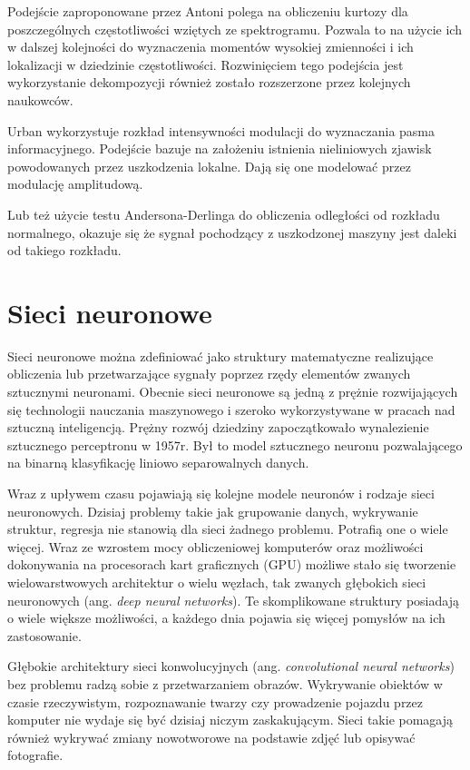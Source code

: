 \documentclass[inzynierska]{pwr_wmat_praca_dyplomowa}
\theoremstyle{plain}
\numberwithin{theorem}{chapter}
\theoremstyle{definition}
\numberwithin{theorem}{chapter}
\begin{document}
Podejście zaproponowane przez Antoni\cite{antoni} polega na obliczeniu kurtozy dla poszczególnych częstotliwości wziętych ze spektrogramu. Pozwala to na użycie ich w dalszej kolejności do wyznaczenia momentów wysokiej zmienności i ich lokalizacji w dziedzinie częstotliwości. Rozwinięciem tego podejścia jest wykorzystanie dekompozycji  również zostało rozszerzone przez kolejnych naukowców.\cite{antoni2}

Urban\cite{urban} wykorzystuje rozkład intensywności modulacji do wyznaczania pasma informacyjnego. Podejście bazuje na założeniu istnienia nieliniowych zjawisk powodowanych przez uszkodzenia lokalne. Dają się one modelować przez modulację amplitudową. 

Lub też użycie testu Andersona-Derlinga do obliczenia odległości od rozkładu normalnego, okazuje się że sygnał pochodzący z uszkodzonej maszyny jest daleki od takiego rozkładu\cite{wylomanska}.


\section{Sieci neuronowe}
Sieci neuronowe można zdefiniować jako struktury matematyczne realizujące obliczenia lub przetwarzające sygnały poprzez rzędy elementów zwanych sztucznymi neuronami.
Obecnie sieci neuronowe są jedną z prężnie rozwijających się technologii nauczania maszynowego i szeroko wykorzystywane w pracach nad sztuczną inteligencją.
Prężny rozwój dziedziny zapoczątkowało wynalezienie sztucznego perceptronu w 1957r. Był to model sztucznego neuronu pozwalającego na binarną klasyfikację liniowo separowalnych danych.

Wraz z upływem czasu pojawiają się kolejne modele neuronów i rodzaje sieci neuronowych. Dzisiaj problemy takie jak grupowanie danych, wykrywanie struktur, regresja nie stanowią dla sieci żadnego problemu. Potrafią one o wiele więcej. Wraz ze wzrostem mocy obliczeniowej komputerów oraz możliwości dokonywania na procesorach kart graficznych (GPU) możliwe stało się tworzenie wielowarstwowych architektur o wielu węzłach, tak zwanych głębokich sieci neuronowych (ang. \textit{deep neural networks}). Te skomplikowane struktury posiadają o wiele większe możliwości, a każdego dnia pojawia się więcej pomysłów na ich zastosowanie. 

Głębokie architektury sieci konwolucyjnych (ang. \textit{convolutional neural networks}) bez problemu radzą sobie z przetwarzaniem obrazów. Wykrywanie obiektów w czasie rzeczywistym\cite{ren2015faster}, rozpoznawanie twarzy\cite{lin1997face} czy prowadzenie pojazdu\cite{bojarski2016end} przez komputer nie wydaje się być dzisiaj niczym zaskakującym. Sieci takie pomagają również wykrywać zmiany nowotworowe na podstawie zdjęć\cite{nnnature} lub opisywać fotografie\cite{xu2015show}.
\end{document}
